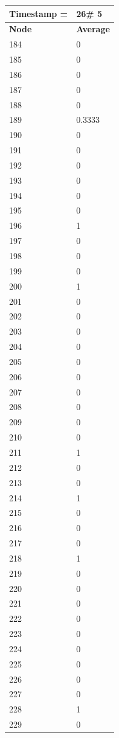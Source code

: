 \begin{tabular}{|l||l|}
\hline
\textbf{Timestamp =} & \textbf{26}\# 5\\\hline
	\textbf{Node} & \textbf{Average} \\ \hline
\hline
	184 & 0 \\ \hline
	185 & 0 \\ \hline
	186 & 0 \\ \hline
	187 & 0 \\ \hline
	188 & 0 \\ \hline
	189 & 0.3333 \\ \hline
	190 & 0 \\ \hline
	191 & 0 \\ \hline
	192 & 0 \\ \hline
	193 & 0 \\ \hline
	194 & 0 \\ \hline
	195 & 0 \\ \hline
	196 & 1 \\ \hline
	197 & 0 \\ \hline
	198 & 0 \\ \hline
	199 & 0 \\ \hline
	200 & 1 \\ \hline
	201 & 0 \\ \hline
	202 & 0 \\ \hline
	203 & 0 \\ \hline
	204 & 0 \\ \hline
	205 & 0 \\ \hline
	206 & 0 \\ \hline
	207 & 0 \\ \hline
	208 & 0 \\ \hline
	209 & 0 \\ \hline
	210 & 0 \\ \hline
	211 & 1 \\ \hline
	212 & 0 \\ \hline
	213 & 0 \\ \hline
	214 & 1 \\ \hline
	215 & 0 \\ \hline
	216 & 0 \\ \hline
	217 & 0 \\ \hline
	218 & 1 \\ \hline
	219 & 0 \\ \hline
	220 & 0 \\ \hline
	221 & 0 \\ \hline
	222 & 0 \\ \hline
	223 & 0 \\ \hline
	224 & 0 \\ \hline
	225 & 0 \\ \hline
	226 & 0 \\ \hline
	227 & 0 \\ \hline
	228 & 1 \\ \hline
	229 & 0 \\ \hline
\end{tabular}
